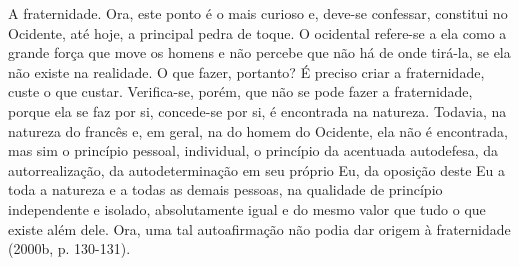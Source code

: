 A fraternidade. Ora, este ponto é o mais curioso e, deve-se confessar,
constitui no Ocidente, até hoje, a principal pedra de toque. O ocidental
refere-se a ela como a grande força que move os homens e não percebe que
não há de onde tirá-la, se ela não existe na realidade. O que fazer,
portanto? É preciso criar a fraternidade, custe o que custar.
Verifica-se, porém, que não se pode fazer a fraternidade, porque ela se
faz por si, concede-se por si, é encontrada na natureza. Todavia, na
natureza do francês e, em geral, na do homem do Ocidente, ela não é
encontrada, mas sim o princípio pessoal, individual, o princípio da
acentuada autodefesa, da autorrealização, da autodeterminação em seu
próprio Eu, da oposição deste Eu a toda a natureza e a todas as demais
pessoas, na qualidade de princípio independente e isolado, absolutamente
igual e do mesmo valor que tudo o que existe além dele. Ora, uma tal
autoafirmação não podia dar origem à fraternidade (2000b, p. 130-131).

